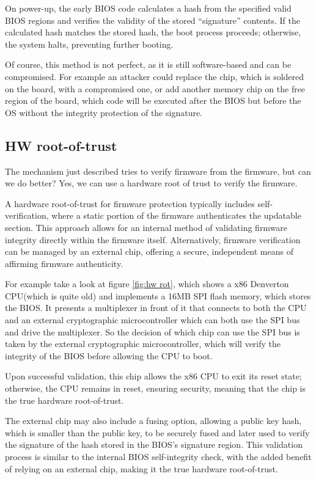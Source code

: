 On power-up, the early BIOS code calculates a hash from the 
specified valid BIOS regions and verifies the validity of the 
stored “signature” contents. If the calculated hash matches 
the stored hash, the boot process proceeds; otherwise, the 
system halts, preventing further booting.

Of course, this method is not perfect, as it is still software-based 
and can be compromised. For example an attacker could replace the 
chip, which is soldered on the board, with a compromised one, or add
another memory chip on the free region of the board, which code will
be executed after the BIOS but before the OS without the integrity 
protection of the signature.

\subsection{HW root-of-trust}
The mechanism just described tries to verify firmware from the
firmware, but can we do better? Yes, we can use a hardware root of 
trust to verify the firmware. 

A hardware root-of-trust for firmware protection typically includes 
self-verification, where a static portion of the firmware authenticates 
the updatable section. This approach allows for an internal method 
of validating firmware integrity directly within the firmware itself. 
Alternatively, firmware verification can be managed by an external 
chip, offering a secure, independent means of affirming firmware 
authenticity.

For example take a look at figure \ref{fig:hw rot}, which shows a x86
Denverton CPU(which is quite old) and implements a 16MB SPI flash
memory, which stores the BIOS. It presents a multiplexer in front of
it that connects to both the CPU and an external cryptographic
microcontroller which can both use the SPI bus and drive the
multiplexer. So the decision of which chip can use the SPI bus is
taken by the external cryptographic microcontroller, which will verify
the integrity of the BIOS before allowing the CPU to boot.

Upon successful validation, this chip allows the x86 CPU to exit its
reset state; otherwise, the CPU remains in reset, ensuring security,
meaning that the chip is the true hardware root-of-trust.

The external chip may also include a fusing option, allowing a public
key hash, which is smaller than the public key, to be securely fused
and later used to verify the signature of the hash stored in the
BIOS's signature region. This validation process is similar to the
internal BIOS self-integrity check, with the added benefit of relying
on an external chip, making it the true hardware root-of-trust.

